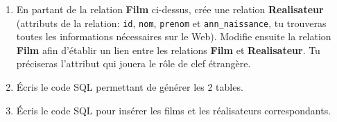 \begin{exercice}
    \begin{enumerate}
        \item 	En partant de la relation \textbf{Film} ci-dessus, crée
              une relation \textbf{Realisateur} (attributs de la
              relation: \texttt{id}, \texttt{nom}, \texttt{prenom} et
              \texttt{ann\_naissance}, tu trouveras toutes les
              informations nécessaires sur le Web).
              Modifie ensuite la relation \textbf{Film} afin d'établir
              un lien entre les relations \textbf{Film} et
              \textbf{Realisateur}. Tu préciseras l'attribut qui
              jouera le rôle de clef étrangère.
              
        \item 	\'Ecris le code \textsc{SQL} permettant de générer les 2 tables.
        \item   \'Ecris le code \textsc{SQL} pour insérer les films et les réalisateurs correspondants.
    \end{enumerate}
\end{exercice}
